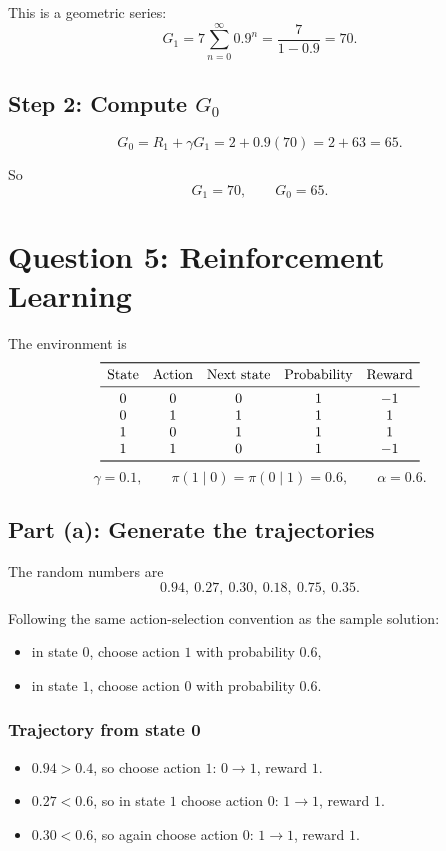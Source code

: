 \documentclass[11pt]{article}
\begin{document}
This is a geometric series:
\[
    G_1 = 7\sum_{n=0}^{\infty}0.9^n = \frac{7}{1-0.9}=70.
\]

\subsection*{Step 2: Compute \(G_0\)}

\[
    G_0 = R_1 + \gamma G_1 = 2 + 0.9(70)=2+63=65.
\]

So
\[
    \boxed{G_1=70,\qquad G_0=65.}
\]

\section*{Question 5: Reinforcement Learning}

The environment is
\[
\begin{array}{ccccc}
\toprule
\text{State} & \text{Action} & \text{Next state} & \text{Probability} & \text{Reward} \\
\midrule
0 & 0 & 0 & 1 & -1 \\
0 & 1 & 1 & 1 & 1 \\
1 & 0 & 1 & 1 & 1 \\
1 & 1 & 0 & 1 & -1 \\
\bottomrule
\end{array}
\]
\[
    \gamma=0.1,
    \qquad
    \pi(1\mid 0)=\pi(0\mid 1)=0.6,
    \qquad
    \alpha=0.6.
\]

\subsection*{Part (a): Generate the trajectories}

The random numbers are
\[
    0.94,\ 0.27,\ 0.30,\ 0.18,\ 0.75,\ 0.35.
\]

Following the same action-selection convention as the sample solution:
\begin{itemize}
    \item in state \(0\), choose action \(1\) with probability \(0.6\),
    \item in state \(1\), choose action \(0\) with probability \(0.6\).
\end{itemize}

\subsubsection*{Trajectory from state 0}

\begin{itemize}
    \item \(0.94 > 0.4\), so choose action \(1\): \(0 \to 1\), reward \(1\).
    \item \(0.27 < 0.6\), so in state \(1\) choose action \(0\): \(1 \to 1\), reward \(1\).
    \item \(0.30 < 0.6\), so again choose action \(0\): \(1 \to 1\), reward \(1\).
\end{itemize}
\end{document}
